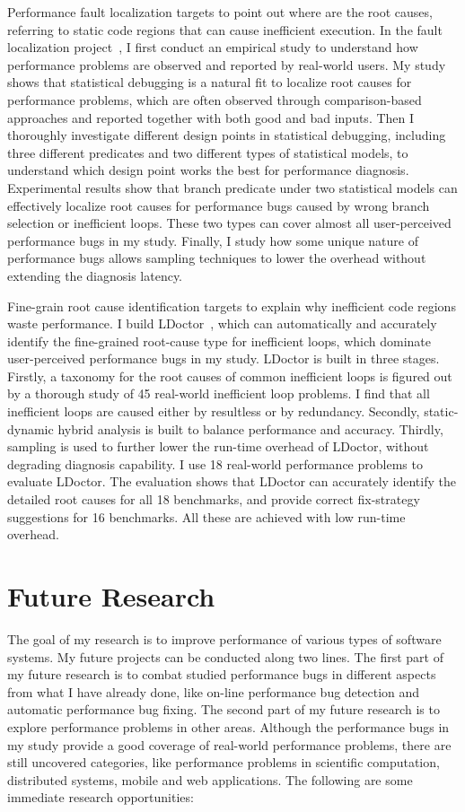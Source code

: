 \documentclass[10pt]{article}
\begin{document}
Performance fault localization targets to point out where are the root causes, 
referring to static code regions that can cause inefficient execution. 
In the fault localization project~\cite{Song14OOPSLA}, 
I first conduct an empirical study to understand how performance problems 
are observed and reported by real-world users. 
My study shows that statistical debugging is a natural fit to localize root causes for performance problems, 
which are often observed through comparison-based
approaches and reported together with both good and bad inputs. 
Then I thoroughly investigate different design points
in statistical debugging, including three different predicates
and two different types of statistical models, to understand
which design point works the best for performance diagnosis.
Experimental results show that branch predicate under two statistical models 
can effectively localize root causes for performance bugs caused by wrong branch selection or inefficient loops. 
These two types can cover almost all user-perceived performance bugs in my study. 
Finally, I study how some unique nature of performance
bugs allows sampling techniques to lower the overhead without extending the diagnosis latency. 

Fine-grain root cause identification targets to explain why inefficient code regions waste performance. 
I build LDoctor~\cite{Song15OOPSLA}, which can automatically and accurately identify the fine-grained root-cause type
for inefficient loops, which dominate user-perceived performance bugs in my study. 
LDoctor is built in three stages. 
Firstly, a taxonomy for the root causes of common inefficient loops is figured out by a thorough study of 45 real-world inefficient loop problems. 
I find that all inefficient loops are caused either by resultless or by redundancy. 
Secondly, static-dynamic hybrid analysis is built to balance performance and accuracy.
Thirdly, sampling is used to further lower the run-time overhead of LDoctor, without degrading diagnosis capability. 
I use 18 real-world performance problems to evaluate LDoctor. 
The evaluation shows that LDoctor can accurately identify the detailed root causes for all 18 benchmarks, 
and provide correct fix-strategy suggestions for 16 benchmarks. 
All these are achieved with low run-time overhead. 


\section{Future Research}

The goal of my research is to improve performance of various types of software systems. 
My future projects can be conducted along two lines. 
The first part of my future research is to combat studied performance bugs in different aspects from what I have already done, 
like on-line performance bug detection and automatic performance bug fixing. 
The second part of my future research is to explore performance problems in other areas. 
Although the performance bugs in my study provide a good coverage of real-world performance problems, 
there are still uncovered categories, 
like performance problems in scientific computation, distributed systems, mobile and web applications. 
The following are some immediate research opportunities: 
\end{document}
